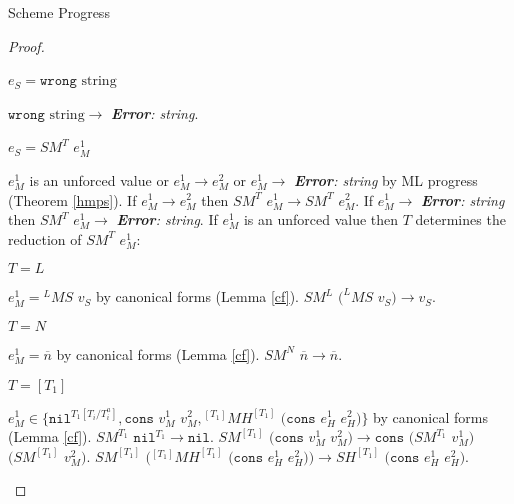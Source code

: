\begin{theorem}{Scheme Progress}
\begin{proof}
\begin{case}
\end{case}


\begin{case}

$e_{S}=\mathtt{wrong}$ $\mathrm{string}$

$\mathtt{wrong}$ $\mathrm{string}\rightarrow$ \emph{\textbf{Error}: string}.

\end{case}


\begin{case}

$e_{S}=SM^{T}$ $e_{M}^{1}$

$e_{M}^{1}$ is an unforced value or $e_{M}^{1}\rightarrow e_{M}^{2}$ or $e_{M}^{1}\rightarrow$ \emph{\textbf{Error}: string} by ML progress (Theorem \ref{hmps}).  If $e_{M}^{1}\rightarrow e_{M}^{2}$ then $SM^{T}$ $e_{M}^{1}\rightarrow SM^{T}$ $e_{M}^{2}$.  If $e_{M}^{1}\rightarrow$ \emph{\textbf{Error}: string} then $SM^{T}$ $e_{M}^{1}\rightarrow$ \emph{\textbf{Error}: string}.  If $e_{M}^{1}$ is an unforced value then $T$ determines the reduction of $SM^{T}$ $e_{M}^{1}$:

\begin{subcase}

$T=L$

$e_{M}^{1}={^{L}M}S$ $v_{S}$ by canonical forms (Lemma \ref{cf}).  $SM^{L}$ $(^{L}MS$ $v_{S})\rightarrow v_{S}$.

\end{subcase}

\begin{subcase}

$T=N$

$e_{M}^{1}=\overline{n}$ by canonical forms (Lemma \ref{cf}).  $SM^{N}$ $\overline{n}\rightarrow\overline{n}$.

\end{subcase}

\begin{subcase}

$T=[T_{1}]$

$e_{M}^{1}\in\lbrace\mathtt{nil}^{T_{1}[T_{i}/T_{i}^{a}]},\mathtt{cons}$ $v_{M}^{1}$ $v_{M}^{2},{^{[T_{1}]}M}H^{[T_{1}]}$ $(\mathtt{cons}$ $e_{H}^{1}$ $e_{H}^{2})\rbrace$ by canonical forms (Lemma \ref{cf}).  $SM^{T_{1}}$ $\mathtt{nil}^{T_{1}}\rightarrow\mathtt{nil}$.  $SM^{[T_{1}]}$ $(\mathtt{cons}$ $v_{M}^{1}$ $v_{M}^{2})\rightarrow\mathtt{cons}$ $(SM^{T_{1}}$ $v_{M}^{1})$ $(SM^{[T_{1}]}$ $v_{M}^{2})$.  $SM^{[T_{1}]}$ $({^{[T_{1}]}M}H^{[T_{1}]}$ $(\mathtt{cons}$ $e_{H}^{1}$ $e_{H}^{2}))\rightarrow SH^{[T_{1}]}$ $(\mathtt{cons}$ $e_{H}^{1}$ $e_{H}^{2})$.


\end{subcase}
\end{case}
\end{proof}
\end{theorem}
